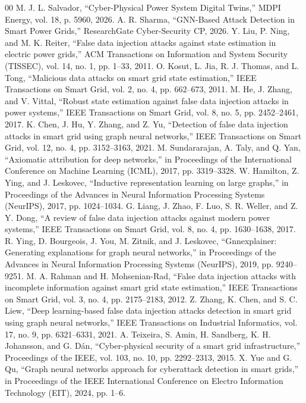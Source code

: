 \documentclass[journal]{IEEEtran}
\begin{document}
\begin{thebibliography}{00}
 M. J. L. Salvador, ``Cyber-Physical Power System Digital Twins,'' MDPI Energy, vol. 18, p. 5960, 2026.
 A. R. Sharma, ``GNN-Based Attack Detection in Smart Power Grids,'' ResearchGate Cyber-Security CP, 2026.
 Y. Liu, P. Ning, and M. K. Reiter, ``False data injection attacks against state estimation in electric power grids,'' ACM Transactions on Information and System Security (TISSEC), vol. 14, no. 1, pp. 1--33, 2011.
 O. Kosut, L. Jia, R. J. Thomas, and L. Tong, ``Malicious data attacks on smart grid state estimation,'' IEEE Transactions on Smart Grid, vol. 2, no. 4, pp. 662--673, 2011.
 M. He, J. Zhang, and V. Vittal, ``Robust state estimation against false data injection attacks in power systems,'' IEEE Transactions on Smart Grid, vol. 8, no. 5, pp. 2452--2461, 2017.
 K. Chen, J. Hu, Y. Zhang, and Z. Yu, ``Detection of false data injection attacks in smart grid using graph neural networks,'' IEEE Transactions on Smart Grid, vol. 12, no. 4, pp. 3152--3163, 2021.
 M. Sundararajan, A. Taly, and Q. Yan, ``Axiomatic attribution for deep networks,'' in Proceedings of the International Conference on Machine Learning (ICML), 2017, pp. 3319--3328.
 W. Hamilton, Z. Ying, and J. Leskovec, ``Inductive representation learning on large graphs,'' in Proceedings of the Advances in Neural Information Processing Systems (NeurIPS), 2017, pp. 1024--1034.
 G. Liang, J. Zhao, F. Luo, S. R. Weller, and Z. Y. Dong, ``A review of false data injection attacks against modern power systems,'' IEEE Transactions on Smart Grid, vol. 8, no. 4, pp. 1630--1638, 2017.
 R. Ying, D. Bourgeois, J. You, M. Zitnik, and J. Leskovec, ``Gnnexplainer: Generating explanations for graph neural networks,'' in Proceedings of the Advances in Neural Information Processing Systems (NeurIPS), 2019, pp. 9240--9251.
 M. A. Rahman and H. Mohsenian-Rad, ``False data injection attacks with incomplete information against smart grid state estimation,'' IEEE Transactions on Smart Grid, vol. 3, no. 4, pp. 2175--2183, 2012.
 Z. Zhang, K. Chen, and S. C. Liew, ``Deep learning-based false data injection attacks detection in smart grid using graph neural networks,'' IEEE Transactions on Industrial Informatics, vol. 17, no. 9, pp. 6321--6331, 2021.
 A. Teixeira, S. Amin, H. Sandberg, K. H. Johansson, and G. Dán, ``Cyber-physical security of a smart grid infrastructure,'' Proceedings of the IEEE, vol. 103, no. 10, pp. 2292--2313, 2015.
 X. Yue and G. Qu, ``Graph neural networks approach for cyberattack detection in smart grids,'' in Proceedings of the IEEE International Conference on Electro Information Technology (EIT), 2024, pp. 1--6.
\end{thebibliography}
\end{document}
